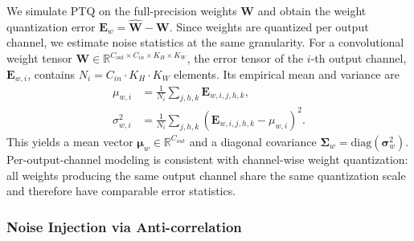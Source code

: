 \documentclass{article}
\begin{document}
We simulate PTQ on the full-precision weights $\boldsymbol{W}$ and obtain the weight quantization error $\boldsymbol{E}_w = \hat{\boldsymbol{W}} - \boldsymbol{W}$. Since weights are quantized per output channel, we estimate noise statistics at the same granularity. For a convolutional weight tensor $\boldsymbol{W} \in \mathbb{R}^{C_{out}\times C_{in}\times K_H\times K_W}$, the error tensor of the $i$-th output channel, $\boldsymbol{E}_{w,i}$, contains $N_i = C_{in} \cdot K_H \cdot K_W$ elements. Its empirical mean and variance are
\begin{align}
    \mu_{w,i}   &= \frac{1}{N_i} \sum_{j,h,k} \boldsymbol{E}_{w,i,j,h,k}, \label{eqt:conv_noise_mean} \\
    \sigma^2_{w,i} &= \frac{1}{N_i} \sum_{j,h,k} (\boldsymbol{E}_{w,i,j,h,k} - \mu_{w,i})^2. \label{eqt:conv_noise_var}
\end{align}
This yields a mean vector $\boldsymbol{\mu}_w \in \mathbb{R}^{C_{out}}$ and a diagonal covariance $\boldsymbol{\Sigma}_w=\mathrm{diag}(\boldsymbol{\sigma}^2_w)$. Per-output-channel modeling is consistent with channel-wise weight quantization: all weights producing the same output channel share the same quantization scale and therefore have comparable error statistics.

\subsubsection{Noise Injection via Anti-correlation}
\label{sec:wqn_injection}
\end{document}
